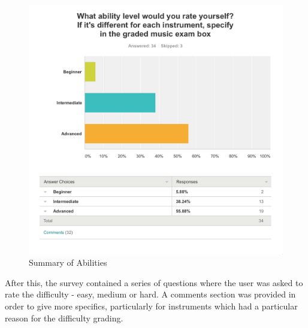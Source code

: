 \begin{appendices}
\begin{figure}[H]
\centering
\includegraphics[width=\textwidth]{survey_results/ability}
\caption{Summary of Abilities}	
\label{fig:range}
\end{figure}

After this, the survey contained a series of questions where the user was asked to rate the difficulty - easy, medium or hard. A comments section was provided in order to give more specifics, particularly for instruments which had a particular reason for the difficulty grading.


\end{appendices}
